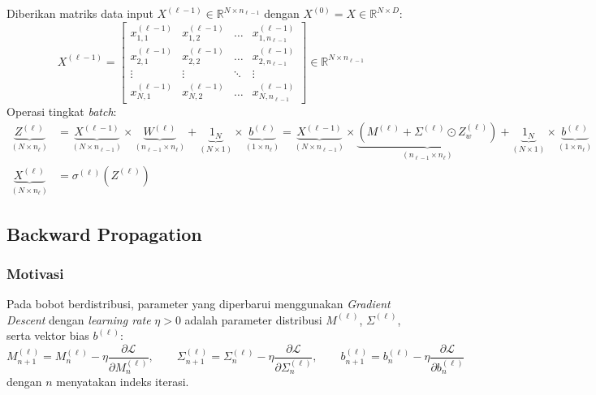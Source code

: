 \documentclass[11pt,a4paper]{article}
\def\mathbf#1{#1}%
\theoremstyle{plain}
\theoremstyle{definition}
\theoremstyle{remark}
\begin{document}
\noindent Diberikan matriks data input $X^{(\ell-1)} \in \mathbb{R}^{N \times n_{\ell-1}}$ dengan $X^{(0)} = X \in \mathbb{R}^{N \times D}$:
\begin{equation}
    X^{(\ell-1)} = \begin{bmatrix}
        x^{(\ell-1)}_{1, 1} & x^{(\ell-1)}_{1, 2} & \dots & x^{(\ell-1)}_{1, n_{\ell-1}} \\
        x^{(\ell-1)}_{2, 1} & x^{(\ell-1)}_{2, 2} & \dots & x^{(\ell-1)}_{2, n_{\ell-1}} \\
        \vdots & \vdots & \ddots & \vdots \\
        x^{(\ell-1)}_{N, 1} & x^{(\ell-1)}_{N, 2} & \dots & x^{(\ell-1)}_{N, n_{\ell-1}}
    \end{bmatrix} \in \mathbb{R}^{N \times n_{\ell-1}} \label{eq:matrix_batch_X_reparam}
\end{equation}
Operasi tingkat \textit{batch}:
\begin{align}
    \underbrace{Z^{(\ell)}}_{(N \times n_\ell)} &= \underbrace{X^{(\ell-1)}}_{(N \times n_{\ell-1})} \times \underbrace{W^{(\ell)}}_{(n_{\ell-1} \times n_\ell)} + \underbrace{\mathbf{1}_N}_{(N \times 1)} \times \underbrace{\mathbf{b}^{(\ell)}}_{(1 \times n_\ell)} = \underbrace{X^{(\ell-1)}}_{(N \times n_{\ell-1})} \times \underbrace{\left( M^{(\ell)} + \Sigma^{(\ell)} \odot Z_w^{(\ell)} \right)}_{(n_{\ell-1} \times n_\ell)} + \underbrace{\mathbf{1}_N}_{(N \times 1)} \times \underbrace{\mathbf{b}^{(\ell)}}_{(1 \times n_\ell)} \label{eq:batch_reparam_z} \\
    \underbrace{X^{(\ell)}}_{(N \times n_\ell)} &= \sigma^{(\ell)}\!\left( Z^{(\ell)} \right) \label{eq:forward_hidden_reparam}
\end{align}

\subsection{Backward Propagation}
\label{subsec:backprop_reparam}

\subsubsection{Motivasi}
\label{subsubsec:motivasi_reparam}

\noindent Pada bobot berdistribusi, parameter yang diperbarui menggunakan \textit{Gradient Descent} dengan \textit{learning rate} $\eta > 0$ adalah parameter distribusi $M^{(\ell)}$, $\Sigma^{(\ell)}$, serta vektor bias $\mathbf{b}^{(\ell)}$:
\begin{equation}
    M^{(\ell)}_{n+1} = M^{(\ell)}_n - \eta \frac{\partial \mathcal{L}}{\partial M^{(\ell)}_n}, \qquad
    \Sigma^{(\ell)}_{n+1} = \Sigma^{(\ell)}_n - \eta \frac{\partial \mathcal{L}}{\partial \Sigma^{(\ell)}_n}, \qquad
    \mathbf{b}^{(\ell)}_{n+1} = \mathbf{b}^{(\ell)}_n - \eta \frac{\partial \mathcal{L}}{\partial \mathbf{b}^{(\ell)}_n} \label{eq:gd_update_reparam}
\end{equation}
dengan $n$ menyatakan indeks iterasi.
\end{document}
